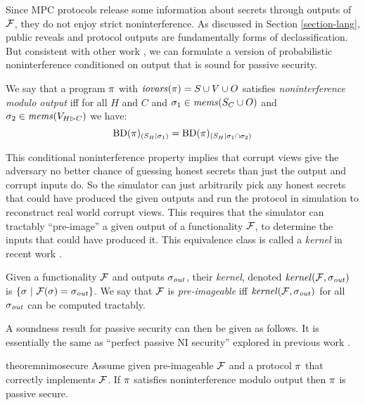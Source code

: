 Since MPC protocols release some information about secrets through
outputs of $\mathcal{F}$, they do not enjoy strict noninterference.  As
discussed in Section \ref{section-lang}, public reveals and protocol
outputs are fundamentally forms of declassification.  But consistent
with other work \cite{8429300}, we can formulate a version of
probabilistic noninterference conditioned on output that is sound
for passive security. 
\begin{definition}
  \label{definition-NIMO}
  We say that a program $\pi$ with $\mathit{iovars}(\pi) = S \cup V \cup O$
  satisfies \emph{noninterference modulo output}
  iff for all $H$ and $C$ and $\sigma_1 \in \mathit{mems}(S_C \cup O)$ and $\sigma_2 \in \mathit{mems}(V_{H \rhd C})$
  we have:
  $$
  \mathrm{BD}(\pi)_{({S_H}|{\sigma_1})} = \mathrm{BD}(\pi)_{({S_H}|{\sigma_1 \cap \sigma_2})}
 $$
\end{definition}
This conditional noninterference property implies that
corrupt views give the adversary no better chance of guessing honest
secrets than just the output and corrupt inputs do. So the simulator
can just arbitrarily pick any honest secrets that could have produced
the given outputs and run the protocol in simulation to reconstruct
real world corrupt views. This requires that the simulator can
tractably ``pre-image'' a given output of a functionality $\mathcal{F}$,
to determine the inputs that could have produced it. This equivalence
class is called a \emph{kernel} in recent work \cite{10.1145/3571740}.
\begin{definition}
  Given a functionality $\mathcal{F}$ and outputs $\sigma_{\mathit{out}}$, their 
  \emph{kernel}, denoted $\mathit{kernel}(\mathcal{F},\sigma_{\mathit{out}})$ is
  $
  \{ \sigma\ |\ \mathcal{F}(\sigma) = \sigma_{\mathit{out}} \}
  $.
  We say that $\mathcal{F}$ is \emph{pre-imageable} iff $\mathit{kernel}(\mathcal{F}, \sigma_{\mathit{out}})$ for all
  $\sigma_{\mathit{out}}$ can be computed tractably.
\end{definition}
A soundness result for passive security can then be given as follows.
It is essentially the same as ``perfect passive NI security'' explored
in previous work \cite{8429300}.  
\begin{restatable}{theorem}{nimosecure}
  \label{theorem-nimo}
  Assume given pre-imageable $\mathcal{F}$ and a protocol $\pi$ that
  correctly implements $\mathcal{F}$.  If $\pi$ satisfies noninterference modulo output
  then $\pi$ is passive secure.
\end{restatable}


